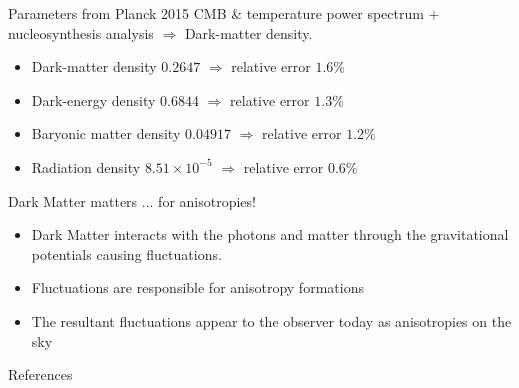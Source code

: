 \documentclass{beamer}
\begin{document}
\begin{frame}{Parameters from Planck 2015}
CMB \& temperature power spectrum  $+$ nucleosynthesis analysis $\Rightarrow$ Dark-matter density.
\vspace{0.3cm}
\begin{itemize}
    \item Dark-matter density $0.2647$ $\Rightarrow$ relative error $1.6 \%$
    \vspace{0.3cm}
    \item Dark-energy density $0.6844$ $\Rightarrow$ relative error $1.3 \%$
        \vspace{0.3cm}

    \item Baryonic matter density $0.04917$ $\Rightarrow$ relative error $1.2 \%$
        \vspace{0.3cm}

    \item Radiation density $8.51 \times 10^{-5}$ $\Rightarrow$ relative error $0.6 \%$
\end{itemize}
\end{frame}

\begin{frame}{Dark Matter matters ... for anisotropies!}
    \begin{itemize}
        \item Dark Matter interacts with the photons and matter through the gravitational potentials causing fluctuations.
        \vspace{0.5cm}
        \item Fluctuations are  responsible for anisotropy formations
        \vspace{0.5cm}
        \item The resultant fluctuations appear to the observer today as anisotropies on the sky
    \end{itemize}

\end{frame}



\begin{frame}[allowframebreaks]{References}
\nocite{*}


\end{frame}
\end{document}
